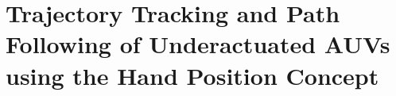 \chapter{Trajectory Tracking and Path Following of Underactuated AUVs using the Hand Position Concept}
\label{chap:handpos_trajectory}

